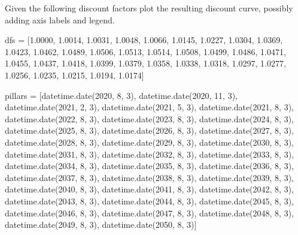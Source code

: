 \cprotEnv\begin{question}
Given the following discount factors plot the resulting discount curve, possibly adding axis labels and legend.

\begin{ipython}
dfs = [1.0000, 1.0014, 1.0031, 1.0048,
       1.0066, 1.0145, 1.0227,
       1.0304, 1.0369, 1.0423,
       1.0462, 1.0489, 1.0506, 
       1.0513, 1.0514, 1.0508,
       1.0499, 1.0486, 1.0471,
       1.0455, 1.0437, 1.0418,
       1.0399, 1.0379, 1.0358,
       1.0338, 1.0318, 1.0297,
       1.0277, 1.0256, 1.0235,
       1.0215, 1.0194, 1.0174]

pillars = [datetime.date(2020, 8, 3), datetime.date(2020, 11, 3),
           datetime.date(2021, 2, 3), datetime.date(2021, 5, 3),
           datetime.date(2021, 8, 3), datetime.date(2022, 8, 3),
           datetime.date(2023, 8, 3), datetime.date(2024, 8, 3),
           datetime.date(2025, 8, 3), datetime.date(2026, 8, 3),
           datetime.date(2027, 8, 3), datetime.date(2028, 8, 3),
           datetime.date(2029, 8, 3), datetime.date(2030, 8, 3),
           datetime.date(2031, 8, 3), datetime.date(2032, 8, 3),
           datetime.date(2033, 8, 3), datetime.date(2034, 8, 3),
           datetime.date(2035, 8, 3), datetime.date(2036, 8, 3),
           datetime.date(2037, 8, 3), datetime.date(2038, 8, 3),
           datetime.date(2039, 8, 3), datetime.date(2040, 8, 3),
           datetime.date(2041, 8, 3), datetime.date(2042, 8, 3),
           datetime.date(2043, 8, 3), datetime.date(2044, 8, 3),
           datetime.date(2045, 8, 3), datetime.date(2046, 8, 3),
           datetime.date(2047, 8, 3), datetime.date(2048, 8, 3),
           datetime.date(2049, 8, 3), datetime.date(2050, 8, 3)]
\end{ipython}
\end{question}

